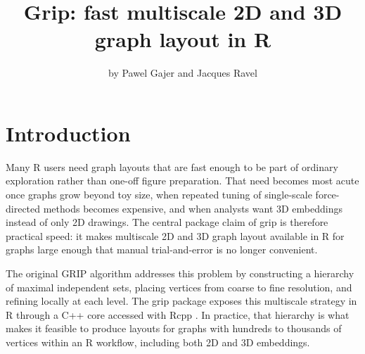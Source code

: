 \title{Grip: fast multiscale 2D and 3D graph layout in R}


\author{by Pawel Gajer and Jacques Ravel}

\maketitle


\section{Introduction}\label{introduction}

Many R users need graph layouts that are fast enough to be part of ordinary
exploration rather than one-off figure preparation. That need becomes most
acute once graphs grow beyond toy size, when repeated tuning of single-scale
force-directed methods becomes expensive, and when analysts want 3D embeddings
instead of only 2D drawings. The central package claim of grip is therefore
practical speed: it makes multiscale 2D and 3D graph layout available in R for
graphs large enough that manual trial-and-error is no longer convenient.

The original GRIP algorithm \citep{gajer2002, gajer2004} addresses this problem by
constructing a hierarchy of maximal independent sets, placing vertices from
coarse to fine resolution, and refining locally at each level. The grip package
exposes this multiscale strategy in R through a C++ core accessed with Rcpp
\citep{eddelbuettel2011}. In practice, that hierarchy is what makes it feasible to
produce layouts for graphs with hundreds to thousands of vertices within an R
workflow, including both 2D and 3D embeddings.

